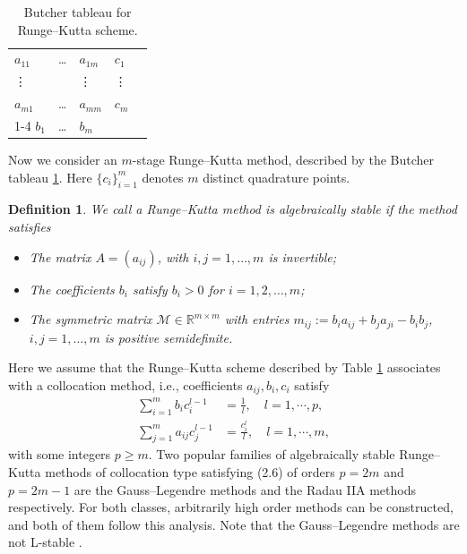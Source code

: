 \documentclass[a4paper, oneside]{book}
\newtheorem{definition}{Definition}[section]
\begin{document}
\begin{table}[h]
\begin{center}
\begin{tabular}{lll|ll}
$a_{11}$  &\ldots &$a_{1m}$ &$c_1$  &  \\
\vdots    &       &\vdots   &\vdots &  \\
$a_{m1}$  &\ldots &$a_{mm}$ &$c_m$  &  \\ \cline{1-4}
$b_{1}$   &\ldots & $b_{m}$ & &
\end{tabular}
\end{center}
\caption{Butcher tableau for Runge--Kutta scheme.}\label{tab:RK}
\end{table}

Now we consider an $m$-stage Runge--Kutta method, described by the Butcher tableau \ref{tab:RK}. %
Here $\{c_i\}_{i=1}^m$ denotes $m$ distinct quadrature points.
\begin{definition}
We call a Runge--Kutta method is algebraically stable if the method satisfies
\begin{itemize}
\item[{\bf (P5)(a)}] The matrix $A = (a_{ij})$, with $i,j=1,\ldots,m$ is invertible;
\item[{\bf (P5)(b)}] The coefficients $b_i$ satisfy $b_i>0$ for $i=1,2,\dots,m$;
\item[{\bf (P5)(c)}] The  symmetric matrix $\mathcal{M}\in  \mathbb{R}^{m\times m }$
with entries $m_{ij} := b_ia_{ij} + b_ja_{ji} - b_ib_j$, $i, j = 1,\ldots,m$
is positive semidefinite. %
\end{itemize}
\end{definition}

Here we assume that the Runge--Kutta scheme described  by Table \ref{tab:RK}
associates with a collocation method, i.e., coefficients $a_{ij}, b_i, c_i$ satisfy
\begin{align}
        \sum_{i=1}^m b_i c_i^{l-1} &= \frac1l, \quad l = 1, \cdots, p,\label{eqn:accuracy} \\
        \sum_{j=1}^m a_{ij} c_j^{l-1} &= \frac{c_i^l}l, \quad l = 1, \cdots, m,\label{eqn:stage-order}
\end{align}
with some integers $p\ge m$. Two popular families of algebraically stable Runge--Kutta
methods of collocation type satisfying (2.6) of orders $p = 2m$ and $p = 2m - 1$
 are the Gauss--Legendre  methods and the Radau IIA methods respectively. For both classes,
arbitrarily high order methods can be constructed, and both of them follow this analysis. Note that the Gauss--Legendre methods
are not L-stable \cite{HairerWanner:2010}.
\end{document}
